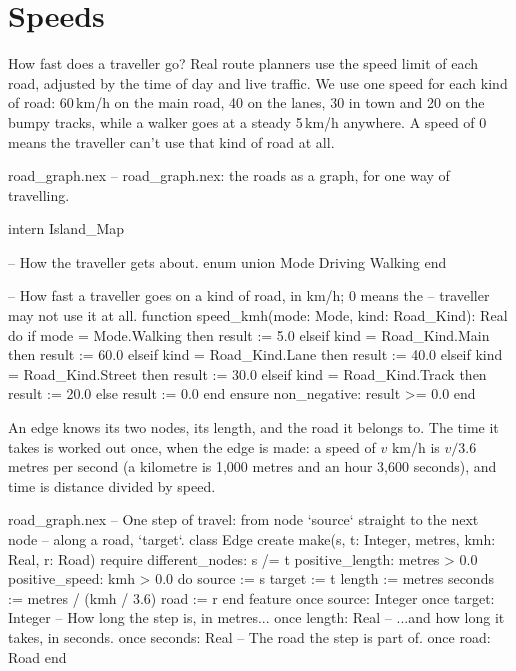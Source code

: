\section{Speeds}

How fast does a traveller go? Real route planners use the speed limit of
each road, adjusted by the time of day and live traffic. We use one speed
for each kind of road: 60\,km/h on the main road, 40 on the lanes, 30 in
town and 20 on the bumpy tracks, while a walker goes at a steady
5\,km/h anywhere. A speed of 0 means the traveller can't use that kind of
road at all.

\begin{newfile}{road_graph.nex}
-- road_graph.nex: the roads as a graph, for one way of travelling.

intern Island_Map

-- How the traveller gets about.
enum union Mode
  Driving
  Walking
end

-- How fast a traveller goes on a kind of road, in km/h; 0 means the
-- traveller may not use it at all.
function speed_kmh(mode: Mode, kind: Road_Kind): Real do
  if mode = Mode.Walking then
    result := 5.0
  elseif kind = Road_Kind.Main then
    result := 60.0
  elseif kind = Road_Kind.Lane then
    result := 40.0
  elseif kind = Road_Kind.Street then
    result := 30.0
  elseif kind = Road_Kind.Track then
    result := 20.0
  else
    result := 0.0
  end
ensure
  non_negative: result >= 0.0
end
\end{newfile}

An edge knows its two nodes, its length, and the road it belongs to. The
time it takes is worked out once, when the edge is made: a speed of $v$
km/h is $v / 3.6$ metres per second (a kilometre is 1,000 metres and an
hour 3,600 seconds), and time is distance divided by speed.

\begin{append}{road_graph.nex}
-- One step of travel: from node `source` straight to the next node
-- along a road, `target`.
class Edge
create
  make(s, t: Integer, metres, kmh: Real, r: Road)
  require
    different_nodes: s /= t
    positive_length: metres > 0.0
    positive_speed: kmh > 0.0
  do
    source := s
    target := t
    length := metres
    seconds := metres / (kmh / 3.6)
    road := r
  end
feature
  once source: Integer
  once target: Integer
  -- How long the step is, in metres...
  once length: Real
  -- ...and how long it takes, in seconds.
  once seconds: Real
  -- The road the step is part of.
  once road: Road
end
\end{append}


